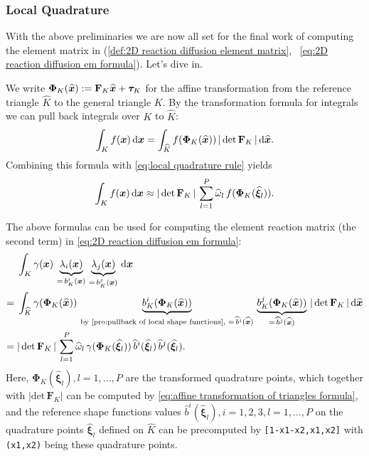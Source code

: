 	\subsubsection*{Local Quadrature}
	With the above preliminaries we are now all set for the final work
	of computing the element matrix in 
	(\ref{def:2D reaction diffusion element matrix},~%
	 \ref{eq:2D reaction diffusion em formula}). Let's dive in.
	
	We write $\bm{\Phi}_K(\widehat{\bm{x}}):=\mathbf{F}_K\widehat{\bm{x}}+
	\bm{\tau}_K$ for the affine transformation from the reference triangle
	$\widehat{K}$ to the general triangle $K$. By the transformation formula 
	for integrals we can pull back integrals over $K$ to $\widehat{K}$:
	\begin{equation}
		\int_{K} f(\bm{x})\,\mathrm{d}\bm{x}=\int_{\widehat{K}} f(\bm{\Phi}_K(\widehat{\bm{x}}))
		\,|\,\mathrm{det}\,\mathbf{F}_K\,|\,\mathrm{d}\widehat{\bm{x}}.
	\end{equation}
	Combining this formula with \eqref{eq:local quadrature rule} yields
	\begin{equation}\label{eq:transformed quadrature rule}
		\int_{K} f(\bm{x})\,\mathrm{d}\bm{x}\approx|\,\mathrm{det}\,\mathbf{F}_K\,|\,
		\sum_{l=1}^{P}\widehat{\omega}_l\,f(\bm{\Phi}_K(\widehat{\bm{\xi}}_l)).
	\end{equation}
	
	The above formulas can be used for computing the element reaction matrix 
	(the second term) in \eqref{eq:2D reaction diffusion em formula}:
	\begin{align}
		&\int_{K} \gamma(\bx)\,\underbrace{\lambda_i(\bx)}_{=\,b_K^i(\bx)}\,
		\underbrace{\lambda_j(\bx)}_{=\,b_K^j(\bx)}\,\dx \nonumber \\ 
		=\;&\int_{\widehat{K}} \gamma(\bm{\Phi}_K(\widehat{\bx}))\,
		\underbrace{b_K^i(\bm{\Phi}_K(\widehat{\bx}))}_{\textrm{by 
		\eqref{pro:pullback of local shape functions}, }=\,
			\widehat{b}^i(\widehat{\bx}) }\,
		\underbrace{b_K^j(\bm{\Phi}_K(\widehat{\bx}))}_{=\,
			\widehat{b}^j(\widehat{\bx}) }\,
		|\,\mathrm{det}\,\mathbf{F}_K\,|\,\rd\widehat{\bx} \nonumber \\ 
		=\;&|\,\mathrm{det}\,\mathbf{F}_K\,|\,
		\sum_{l=1}^{P}\widehat{\omega}_l\,
		\gamma(\bm{\Phi}_K(\widehat{\bm{\xi}}_l))\,
		\widehat{b}^i(\widehat{\bm{\xi}}_l)\,
		\widehat{b}^j(\widehat{\bm{\xi}}_l).%
		\label{eq:element reaction matrix quadrature formula}
	\end{align}	
	Here, $\bm{\Phi}_K(\widehat{\bm{\xi}}_l), l=1,...,P$ are the transformed 
	quadrature points, which together with $|\mathrm{det}\,\mathbf{F}_K|$
	can be computed by \eqref{eq:affine transformation of triangles formula},
	and the reference shape functions values 
	$\widehat{b}^i(\widehat{\bm{\xi}}_l), i=1,2,3, l=1,...,P$ on the 
	quadrature points $\widehat{\bm{\xi}}_l$ defined on $\widehat{K}$ can 
	be precomputed by \texttt{[1-x1-x2,x1,x2]} with \texttt{(x1,x2)} 
	being these quadrature points. 
	
